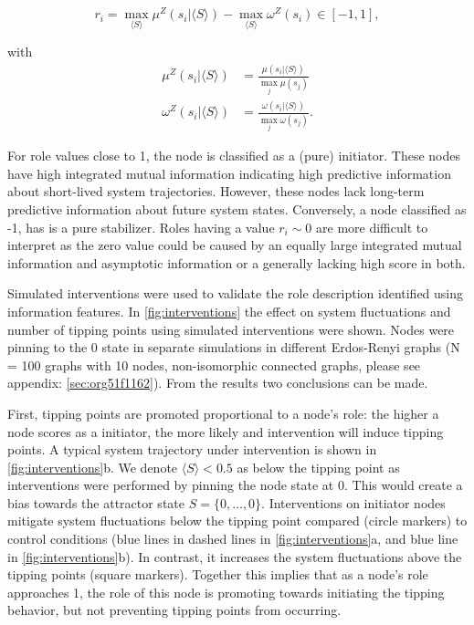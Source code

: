 \documentclass[a4paper, 11pt, twocolumn]{article}
\begin{document}
\begin{equation}
r_i  = \max_{\langle S \rangle}  \mu^Z(s_i | \langle S \rangle) - \max_{\langle S  \rangle} \omega^Z(s_i) \in  [-1, 1],
\end{equation}

with
\begin{equation}
\begin{aligned}
\mu^Z(s_i |  \langle S  \rangle) &=  \frac{\mu(s_i |  \langle S  \rangle )}{\max_j
\mu(s_j)}\\
\omega^Z(s_i | \langle S \rangle  ) &= \frac{\omega(s_i | \langle S \rangle)}{\max_j
\omega(s_j)}.
\end{aligned}
\end{equation}

For role  values close  to 1,  the node  is classified  as a
(pure) initiator.  These nodes  have high  integrated mutual
information  indicating  high predictive  information  about
short-lived system  trajectories. However, these  nodes lack
long-term predictive information about future system states.
Conversely,  a  node  classified  as   -1,  has  is  a  pure
stabilizer.  Roles  having  a  value  \(r_i  \sim  0\)  are  more
difficult to interpret as the  zero value could be caused by
an   equally  large   integrated   mutual  information   and
asymptotic information or a  generally lacking high score in
both.

Simulated  interventions  were  used to  validate  the  role
description  identified   using  information   features.  In
\cref{fig:interventions} the  effect on  system fluctuations
and number  of tipping points using  simulated interventions
were  shown. Nodes were pinning to the 0 state in separate
simulations in different Erdos-Renyi  graphs (N = 100 graphs
with 10  nodes, non-isomorphic connected graphs,  please see
appendix:   \ref{sec:org51f1162}).   From  the   results  two
conclusions can be made.

First, tipping points are  promoted proportional to a node's
role:  the higher  a node  scores as  a initiator,  the more
likely  and  intervention  will  induce  tipping  points.  A
typical  system trajectory  under intervention  is shown  in
\cref{fig:interventions}{b}.  We denote  \(\langle  S \rangle  < 0.5\)  as
below the  tipping point as interventions  were performed by
pinning  the node  state  at  0. This  would  create a  bias
towards  the   attractor  state  \(S  =   \{0,  \dots,  0\}\).
Interventions   on    initiator   nodes    mitigate   system
fluctuations  below  the   tipping  point  compared  (circle
markers) to  control conditions (blue lines  in dashed lines
in   \cref{fig:interventions}{a},    and   blue    line   in
\cref{fig:interventions}{b}). In contrast,  it increases the
system  fluctuations   above  the  tipping   points  (square
markers).  Together  this  implies  that as  a  node's  role
approaches 1,  the role  of this  node is  promoting towards
initiating the tipping behavior,  but not preventing tipping
points from occurring.
\end{document}
